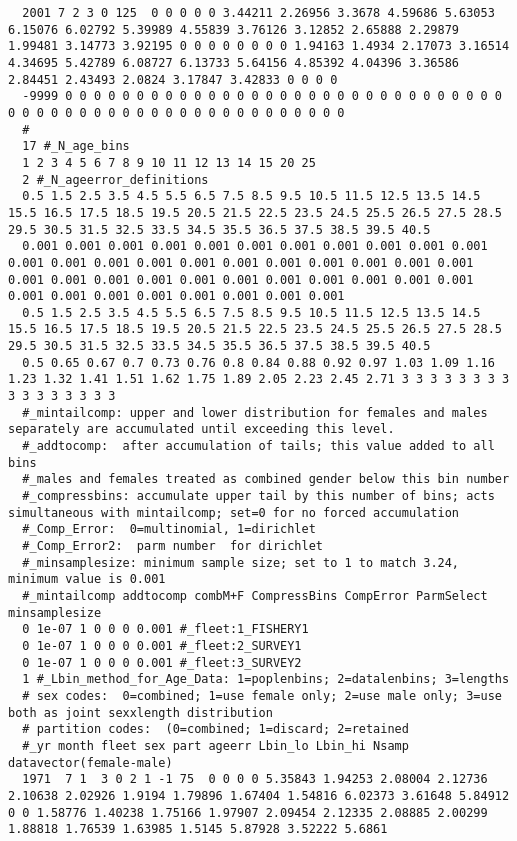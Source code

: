 \begin{landscape}
{\begin{verbatim}
  2001 7 2 3 0 125  0 0 0 0 0 3.44211 2.26956 3.3678 4.59686 5.63053 6.15076 6.02792 5.39989 4.55839 3.76126 3.12852 2.65888 2.29879 1.99481 3.14773 3.92195 0 0 0 0 0 0 0 0 1.94163 1.4934 2.17073 3.16514 4.34695 5.42789 6.08727 6.13733 5.64156 4.85392 4.04396 3.36586  2.84451 2.43493 2.0824 3.17847 3.42833 0 0 0 0
  -9999 0 0 0 0 0 0 0 0 0 0 0 0 0 0 0 0 0 0 0 0 0 0 0 0 0 0 0 0 0 0 0 0 0 0 0 0 0 0 0 0 0 0 0 0 0 0 0 0 0 0 0 0 0 0 0 
  #
  17 #_N_age_bins
  1 2 3 4 5 6 7 8 9 10 11 12 13 14 15 20 25
  2 #_N_ageerror_definitions
  0.5 1.5 2.5 3.5 4.5 5.5 6.5 7.5 8.5 9.5 10.5 11.5 12.5 13.5 14.5 15.5 16.5 17.5 18.5 19.5 20.5 21.5 22.5 23.5 24.5 25.5 26.5 27.5 28.5 29.5 30.5 31.5 32.5 33.5 34.5 35.5 36.5 37.5 38.5 39.5 40.5
  0.001 0.001 0.001 0.001 0.001 0.001 0.001 0.001 0.001 0.001 0.001 0.001 0.001 0.001 0.001 0.001 0.001 0.001 0.001 0.001 0.001 0.001 0.001 0.001 0.001 0.001 0.001 0.001 0.001 0.001 0.001 0.001 0.001 0.001 0.001 0.001 0.001 0.001 0.001 0.001 0.001
  0.5 1.5 2.5 3.5 4.5 5.5 6.5 7.5 8.5 9.5 10.5 11.5 12.5 13.5 14.5 15.5 16.5 17.5 18.5 19.5 20.5 21.5 22.5 23.5 24.5 25.5 26.5 27.5 28.5 29.5 30.5 31.5 32.5 33.5 34.5 35.5 36.5 37.5 38.5 39.5 40.5
  0.5 0.65 0.67 0.7 0.73 0.76 0.8 0.84 0.88 0.92 0.97 1.03 1.09 1.16 1.23 1.32 1.41 1.51 1.62 1.75 1.89 2.05 2.23 2.45 2.71 3 3 3 3 3 3 3 3 3 3 3 3 3 3 3 3
  #_mintailcomp: upper and lower distribution for females and males separately are accumulated until exceeding this level.
  #_addtocomp:  after accumulation of tails; this value added to all bins
  #_males and females treated as combined gender below this bin number 
  #_compressbins: accumulate upper tail by this number of bins; acts simultaneous with mintailcomp; set=0 for no forced accumulation
  #_Comp_Error:  0=multinomial, 1=dirichlet
  #_Comp_Error2:  parm number  for dirichlet
  #_minsamplesize: minimum sample size; set to 1 to match 3.24, minimum value is 0.001
  #_mintailcomp addtocomp combM+F CompressBins CompError ParmSelect minsamplesize
  0 1e-07 1 0 0 0 0.001 #_fleet:1_FISHERY1
  0 1e-07 1 0 0 0 0.001 #_fleet:2_SURVEY1
  0 1e-07 1 0 0 0 0.001 #_fleet:3_SURVEY2
  1 #_Lbin_method_for_Age_Data: 1=poplenbins; 2=datalenbins; 3=lengths
  # sex codes:  0=combined; 1=use female only; 2=use male only; 3=use both as joint sexxlength distribution
  # partition codes:  (0=combined; 1=discard; 2=retained
  #_yr month fleet sex part ageerr Lbin_lo Lbin_hi Nsamp datavector(female-male)
  1971  7 1  3 0 2 1 -1 75  0 0 0 0 5.35843 1.94253 2.08004 2.12736 2.10638 2.02926 1.9194 1.79896 1.67404 1.54816 6.02373 3.61648 5.84912 0 0 1.58776 1.40238 1.75166 1.97907 2.09454 2.12335 2.08885 2.00299 1.88818 1.76539 1.63985 1.5145 5.87928 3.52222 5.6861

\end{verbatim}}
\end{landscape}
